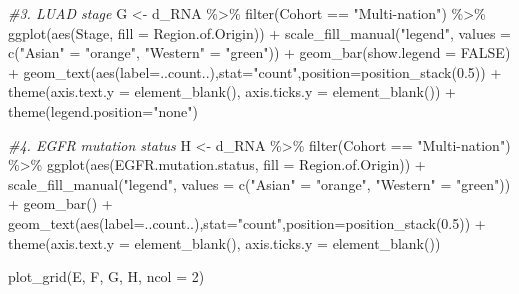 \documentclass[
]{article}
\newenvironment{Shaded}{\begin{snugshade}}{\end{snugshade}}
\newcommand{\AttributeTok}[1]{\textcolor[rgb]{0.77,0.63,0.00}{#1}}
\newcommand{\CommentTok}[1]{\textcolor[rgb]{0.56,0.35,0.01}{\textit{#1}}}
\newcommand{\ConstantTok}[1]{\textcolor[rgb]{0.00,0.00,0.00}{#1}}
\newcommand{\DecValTok}[1]{\textcolor[rgb]{0.00,0.00,0.81}{#1}}
\newcommand{\FloatTok}[1]{\textcolor[rgb]{0.00,0.00,0.81}{#1}}
\newcommand{\FunctionTok}[1]{\textcolor[rgb]{0.00,0.00,0.00}{#1}}
\newcommand{\NormalTok}[1]{#1}
\newcommand{\OtherTok}[1]{\textcolor[rgb]{0.56,0.35,0.01}{#1}}
\newcommand{\SpecialCharTok}[1]{\textcolor[rgb]{0.00,0.00,0.00}{#1}}
\newcommand{\StringTok}[1]{\textcolor[rgb]{0.31,0.60,0.02}{#1}}
\begin{document}
\begin{Shaded}
\begin{Highlighting}[]
\CommentTok{\#3. LUAD stage}
\NormalTok{G }\OtherTok{\textless{}{-}}\NormalTok{ d\_RNA }\SpecialCharTok{\%\textgreater{}\%}
  \FunctionTok{filter}\NormalTok{(Cohort }\SpecialCharTok{==} \StringTok{"Multi{-}nation"}\NormalTok{) }\SpecialCharTok{\%\textgreater{}\%}
  \FunctionTok{ggplot}\NormalTok{(}\FunctionTok{aes}\NormalTok{(Stage, }\AttributeTok{fill =}\NormalTok{ Region.of.Origin)) }\SpecialCharTok{+} 
  \FunctionTok{scale\_fill\_manual}\NormalTok{(}\StringTok{"legend"}\NormalTok{, }\AttributeTok{values =} \FunctionTok{c}\NormalTok{(}\StringTok{"Asian"} \OtherTok{=} \StringTok{"orange"}\NormalTok{, }\StringTok{"Western"} \OtherTok{=} \StringTok{"green"}\NormalTok{)) }\SpecialCharTok{+}
  \FunctionTok{geom\_bar}\NormalTok{(}\AttributeTok{show.legend =} \ConstantTok{FALSE}\NormalTok{) }\SpecialCharTok{+}
  \FunctionTok{geom\_text}\NormalTok{(}\FunctionTok{aes}\NormalTok{(}\AttributeTok{label=}\NormalTok{..count..),}\AttributeTok{stat=}\StringTok{"count"}\NormalTok{,}\AttributeTok{position=}\FunctionTok{position\_stack}\NormalTok{(}\FloatTok{0.5}\NormalTok{)) }\SpecialCharTok{+}
  \FunctionTok{theme}\NormalTok{(}\AttributeTok{axis.text.y =} \FunctionTok{element\_blank}\NormalTok{(),}
        \AttributeTok{axis.ticks.y =} \FunctionTok{element\_blank}\NormalTok{()) }\SpecialCharTok{+} 
  \FunctionTok{theme}\NormalTok{(}\AttributeTok{legend.position=}\StringTok{"none"}\NormalTok{)}

\CommentTok{\#4. EGFR mutation status}
\NormalTok{H }\OtherTok{\textless{}{-}}\NormalTok{ d\_RNA }\SpecialCharTok{\%\textgreater{}\%}
  \FunctionTok{filter}\NormalTok{(Cohort }\SpecialCharTok{==} \StringTok{"Multi{-}nation"}\NormalTok{) }\SpecialCharTok{\%\textgreater{}\%}
  \FunctionTok{ggplot}\NormalTok{(}\FunctionTok{aes}\NormalTok{(EGFR.mutation.status, }\AttributeTok{fill =}\NormalTok{ Region.of.Origin)) }\SpecialCharTok{+} 
  \FunctionTok{scale\_fill\_manual}\NormalTok{(}\StringTok{"legend"}\NormalTok{, }\AttributeTok{values =} \FunctionTok{c}\NormalTok{(}\StringTok{"Asian"} \OtherTok{=} \StringTok{"orange"}\NormalTok{, }\StringTok{"Western"} \OtherTok{=} \StringTok{"green"}\NormalTok{)) }\SpecialCharTok{+}
  \FunctionTok{geom\_bar}\NormalTok{() }\SpecialCharTok{+}
  \FunctionTok{geom\_text}\NormalTok{(}\FunctionTok{aes}\NormalTok{(}\AttributeTok{label=}\NormalTok{..count..),}\AttributeTok{stat=}\StringTok{"count"}\NormalTok{,}\AttributeTok{position=}\FunctionTok{position\_stack}\NormalTok{(}\FloatTok{0.5}\NormalTok{)) }\SpecialCharTok{+}
  \FunctionTok{theme}\NormalTok{(}\AttributeTok{axis.text.y =} \FunctionTok{element\_blank}\NormalTok{(),}
        \AttributeTok{axis.ticks.y =} \FunctionTok{element\_blank}\NormalTok{())}

\FunctionTok{plot\_grid}\NormalTok{(E, F, G, H,}
          \AttributeTok{ncol =} \DecValTok{2}\NormalTok{)}
\end{Highlighting}
\end{Shaded}
\end{document}
